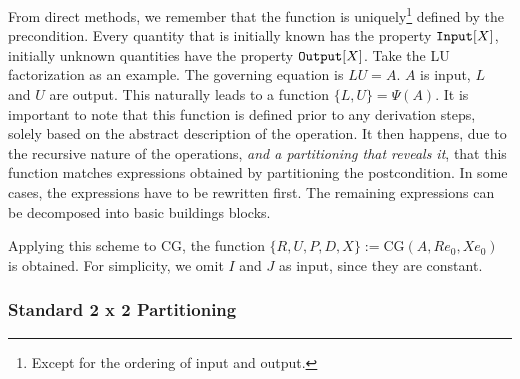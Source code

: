 From direct methods, we remember that the function is  uniquely\footnote{Except for the ordering of input and output.} defined by the precondition. Every quantity that is initially known has the property $\text{\ttfamily Input}[X]$, initially unknown quantities have the property $\text{\ttfamily Output}[X]$. Take the LU factorization as an example. The governing equation is $LU = A$. $A$ is input, $L$ and $U$ are output. This naturally leads to a function $\{L, U\} = \Psi (A)$. It is important to note that this function is defined prior to any derivation steps, solely based on the abstract description of the operation. It then happens, due to the recursive nature of the operations, \emph{and a partitioning that reveals it}, that this function matches expressions obtained by partitioning the postcondition. In some cases, the expressions have to be rewritten first. The remaining expressions can be decomposed into basic buildings blocks.

Applying this scheme to CG, the function $\{R, U, P, D, X\} := \text{CG} (A, R e_0, X e_0)$ is obtained. For simplicity, we omit $I$ and $J$ as input, since they are constant. 

\subsubsection{Standard 2 x 2 Partitioning}

